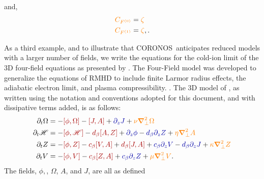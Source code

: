 \documentclass[12pt, letterpaper, oneside, leqno, openright]{memoir}
\newcommand{\coronos}{\textsf{CORONOS}}
\newcommand{\hfield}{\mathscr{H}}
\begin{document}
%
and,
%
\begin{subequations}
\begin{align}
  {\color{orange}C_{F^{(0)}}} &={\color{orange}\zeta}  \label{eq:rmhdczero} \\
  {\color{orange}C_{F^{(1)}}} &={\color{orange}\zeta}, \label{eq:rmhdcone}.
\end{align}
\end{subequations}
%
\par
%
As a third example, and to illustrate that \coronos\ anticipates reduced models
with a larger number of fields, we write the equations for the cold-ion limit of
the 3D four-field equations as presented by \citet{Tassietal2010}. The Four-Field
model was developed to generalize the equations of RMHD to include finite Larmor
radius effects, the adiabatic electron limit, and plasma compressibility.
\citep{Hazeltineetal85,Hazeltineetal87}. The 3D model of \citet{Tassietal2010},
as written using the notation and conventions adopted for this document, and with
dissipative terms added, is as follows:
%
\begin{subequations}
\begin{align}
\pardt \Omega &= - {\color{red!65!black}[\phi,\Omega]}    - {\color{red!65!black}[J,A]}
                 + {\color{blue!65!black} \pardz J}
                 + {\color{orange}\nu\delperp^2   \Omega} \label{eq:ffomega}                           \\
\pardt\hfield &= - {\color{red!65!black}[\phi,\hfield]}   - {\color{red!65!black}d_\beta[A,Z]}
                 + {\color{blue!65!black}\pardz\phi}      - {\color{blue!65!black}d_\beta\pardz Z}
                 + {\color{orange}\eta\delperp^2   A}     \label{eq:ffh}                               \\
\pardt Z      &= - {\color{red!65!black}[\phi,Z]}         - {\color{red!65!black}c_\beta[V,A]} + {\color{red!65!black}d_\beta[J,A]}
                 + {\color{blue!65!black}c_\beta\pardz V} - {\color{blue!65!black}d_\beta\pardz J}
                 + {\color{orange}\kappa\delperp^2 Z}     \label{eq:ffz}                               \\
\pardt V      &= - {\color{red!65!black}[\phi,V]}         - {\color{red!65!black}c_\beta[Z,A]}
                 + {\color{blue!65!black}c_\beta\pardz Z}
                 + {\color{orange}\mu\delperp^2    V}.    \label{eq:ffv}
\end{align}
\end{subequations}
%
The fields, $\phi,$, $\Omega$, $A$, and $J$, are all as defined
\end{document}
